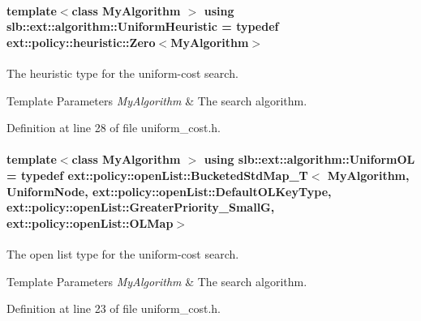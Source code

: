 \paragraph[{\texorpdfstring{Uniform\+Heuristic}{UniformHeuristic}}]{\setlength{\rightskip}{0pt plus 5cm}template$<$class My\+Algorithm $>$ using {\bf slb\+::ext\+::algorithm\+::\+Uniform\+Heuristic} = typedef {\bf ext\+::policy\+::heuristic\+::\+Zero}$<$My\+Algorithm$>$}\hypertarget{namespaceslb_1_1ext_1_1algorithm_a4df6bd68a037486451c16445cb78d21f}{}\label{namespaceslb_1_1ext_1_1algorithm_a4df6bd68a037486451c16445cb78d21f}


The heuristic type for the uniform-\/cost search. 


\begin{DoxyTemplParams}{Template Parameters}
{\em My\+Algorithm} & The search algorithm. \\
\hline
\end{DoxyTemplParams}


Definition at line 28 of file uniform\+\_\+cost.\+h.

\paragraph[{\texorpdfstring{Uniform\+OL}{UniformOL}}]{\setlength{\rightskip}{0pt plus 5cm}template$<$class My\+Algorithm $>$ using {\bf slb\+::ext\+::algorithm\+::\+Uniform\+OL} = typedef {\bf ext\+::policy\+::open\+List\+::\+Bucketed\+Std\+Map\+\_\+T}$<$ My\+Algorithm, {\bf Uniform\+Node}, {\bf ext\+::policy\+::open\+List\+::\+Default\+O\+L\+Key\+Type}, {\bf ext\+::policy\+::open\+List\+::\+Greater\+Priority\+\_\+\+SmallG}, {\bf ext\+::policy\+::open\+List\+::\+O\+L\+Map}$>$}\hypertarget{namespaceslb_1_1ext_1_1algorithm_aebb91df5b56955857d898d76d9ca5873}{}\label{namespaceslb_1_1ext_1_1algorithm_aebb91df5b56955857d898d76d9ca5873}


The open list type for the uniform-\/cost search. 


\begin{DoxyTemplParams}{Template Parameters}
{\em My\+Algorithm} & The search algorithm. \\
\hline
\end{DoxyTemplParams}


Definition at line 23 of file uniform\+\_\+cost.\+h.


